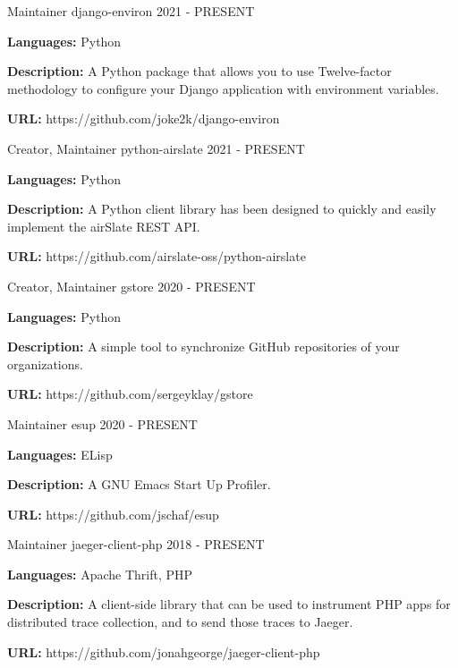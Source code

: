 
\begin{cventries}

  \cventry
    {Maintainer}
    {django-environ}
    {}
    {2021 - PRESENT}
    {
      \begin{cvitems}
        \item {\textbf{Languages:} Python}
        \item {\textbf{Description:} A Python package that allows you to use Twelve-factor methodology to configure your Django application with environment variables.}
        \item {\textbf{URL:} https://github.com/joke2k/django-environ}
      \end{cvitems}
    }

  \cventry
    {Creator, Maintainer}
    {python-airslate}
    {}
    {2021 - PRESENT}
    {
      \begin{cvitems}
        \item {\textbf{Languages:} Python}
        \item {\textbf{Description:} A Python client library has been designed to quickly and easily implement the airSlate REST API.}
        \item {\textbf{URL:} https://github.com/airslate-oss/python-airslate}
      \end{cvitems}
    }

  \cventry
    {Creator, Maintainer}
    {gstore}
    {}
    {2020 - PRESENT}
    {
      \begin{cvitems}
        \item {\textbf{Languages:} Python}
        \item {\textbf{Description:} A simple tool to synchronize GitHub repositories of your organizations.}
        \item {\textbf{URL:} https://github.com/sergeyklay/gstore}
      \end{cvitems}
    }

  \cventry
    {Maintainer}
    {esup}
    {}
    {2020 - PRESENT}
    {
      \begin{cvitems}
        \item {\textbf{Languages:} ELisp}
        \item {\textbf{Description:} A GNU Emacs Start Up Profiler.}
        \item {\textbf{URL:} https://github.com/jschaf/esup}
      \end{cvitems}
    }

  \cventry
    {Maintainer}
    {jaeger-client-php}
    {}
    {2018 - PRESENT}
    {
      \begin{cvitems}
        \item {\textbf{Languages:} Apache Thrift, PHP}
        \item {\textbf{Description:} A client-side library that can be used to instrument PHP apps for distributed trace collection, and to send those traces to Jaeger.}
        \item {\textbf{URL:} https://github.com/jonahgeorge/jaeger-client-php}
      \end{cvitems}
    }


\end{cventries}
